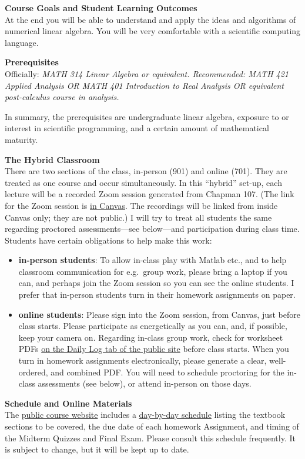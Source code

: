 \documentclass[12pt]{article}
\renewcommand{\emph}[1]{\textsf{\textbf{#1}}}
\newcommand{\localhead}[1]{\par\smallskip\textbf{#1} \smallskip\nobreak\\}%
\def\heading#1{\localhead{\large\emph{#1}}}
\begin{document}
\heading{Course Goals and Student Learning Outcomes}
At the end you will be able to understand and apply the ideas and algorithms of numerical linear algebra.  You will be very comfortable with a scientific computing language.


\clearpage \newpage
\phantom{foo}
\heading{Prerequisites}
Officially: \textsl{MATH 314 Linear Algebra or equivalent.  Recommended: MATH 421 Applied Analysis OR MATH 401 Introduction to Real Analysis OR equivalent post-calculus course in analysis.}

In summary, the prerequisites are undergraduate linear algebra, exposure to or interest in scientific programming, and a certain amount of mathematical maturity.


\heading{The Hybrid Classroom}
There are two sections of the class, in-person (901) and online (701).  They are treated as one course and occur simultaneously.  In this ``hybrid'' set-up, each lecture will be a recorded Zoom session generated from Chapman 107.  (The link for the Zoom session is \href{https://canvas.alaska.edu/courses/27130}{in Canvas}.  The recordings will be linked from inside Canvas only; they are not public.)  I will try to treat all students the same regarding proctored assessments---see below---and participation during class time.  Students have certain obligations to help make this work:
\begin{itemize}
\item \textbf{in-person students}: To allow in-class play with Matlab etc., and to help classroom communication for e.g.~group work, please bring a laptop if you can, and perhaps join the Zoom session so you can see the online students.  I prefer that in-person students turn in their homework assignments on paper.
\item \textbf{online students}: Please sign into the Zoom session, from Canvas, just before class starts.  Please participate as energetically as you can, and, if possible, keep your camera on.  Regarding in-class group work, check for worksheet PDFs \href{https://bueler.github.io/nla/}{on the Daily Log tab of the public site} before class starts.  When you turn in homework assignments electronically, please generate a clear, well-ordered, and combined PDF.  You will need to schedule proctoring for the in-class assessments (see below), or attend in-person on those days.
\end{itemize}


\heading{Schedule and Online Materials}
The \href{https://bueler.github.io/nla/}{public course website} includes a \href{https://bueler.github.io/nla/assets/general/F25/schedule.pdf}{day-by-day schedule} listing the textbook sections to be covered, the due date of each homework Assignment, and timing of the Midterm Quizzes and Final Exam.  Please consult this schedule frequently.  It is subject to change, but it will be kept up to date.
\end{document}
